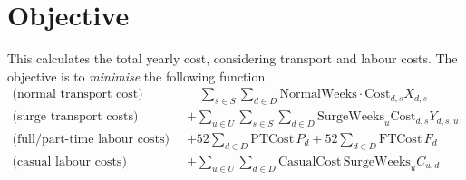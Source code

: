 \documentclass[11pt,a4paper]{article}
\begin{document}
\section{Objective}
This calculates the total yearly cost, considering transport and labour costs.
The objective is to \textit{minimise} the following function.
\begin{align*}
    \text{(normal transport cost)} \qquad&\quad \sum_{s \in S} \sum_{d \in D} \mathrm{NormalWeeks} \cdot \mathrm{Cost}_{d, s}  X_{d,s} \\ 
    \text{(surge transport costs)} \qquad &+ \sum_{u \in U} \sum_{s \in S} \sum_{d \in D} \mathrm{SurgeWeeks}_u \mathrm{Cost}_{d, s} Y_{d,s,u} \\ 
    \text{(full/part-time labour costs)} \qquad &+ 52 \sum_{d \in D} \mathrm{PTCost}\, P_d + 52 \sum_{d \in D}\mathrm{FTCost} \,F_d \\
    \text{(casual labour costs)} \qquad &+\sum_{u \in U} \sum_{d \in D} \mathrm{CasualCost}\,\mathrm{SurgeWeeks}_u C_{u,d}
\end{align*}
\end{document}

